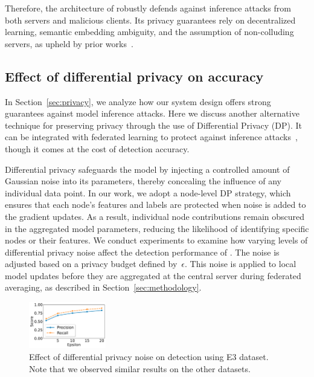 Therefore, the architecture of \Sys robustly defends against inference attacks from both servers and malicious clients. Its privacy guarantees rely on decentralized learning, semantic embedding ambiguity, and the assumption of non-colluding servers, as upheld by prior works~\cite{roy2020crypte,wu2022federated}.

\subsection{Effect of differential privacy on accuracy}
\label{app:dp}

In Section~\ref{sec:privacy}, we analyze how our system design offers strong guarantees against model inference attacks. Here we discuss another alternative technique for preserving privacy through the use of Differential Privacy (DP). It can be integrated with federated learning to protect against inference attacks~\cite{lyu2020threats,nasr2019comprehensive,zari2021efficient}, though it comes at the cost of detection accuracy.

Differential privacy safeguards the model by injecting a controlled amount of Gaussian noise into its parameters, thereby concealing the influence of any individual data point. In our work, we adopt a node-level DP strategy, which ensures that each node’s features and labels are protected when noise is added to the gradient updates. As a result, individual node contributions remain obscured in the aggregated model parameters, reducing the likelihood of identifying specific nodes or their features. We conduct experiments to examine how varying levels of differential privacy noise affect the detection performance of \Sys. The noise is adjusted based on a privacy budget defined by~$\epsilon$. This noise is applied to local \gnnshort model updates before they are aggregated at the central server during federated averaging, as described in Section~\ref{sec:methodology}.

\begin{figure}[!t]
  \centering
  \includegraphics[width=0.3\textwidth]{fig/epsvsscore.pdf}
  \caption{Effect of differential privacy noise on detection using E3 dataset. Note that we observed similar results on the other datasets.}
  \label{epsvsscore}
  \vspace{-2ex}
\end{figure}


